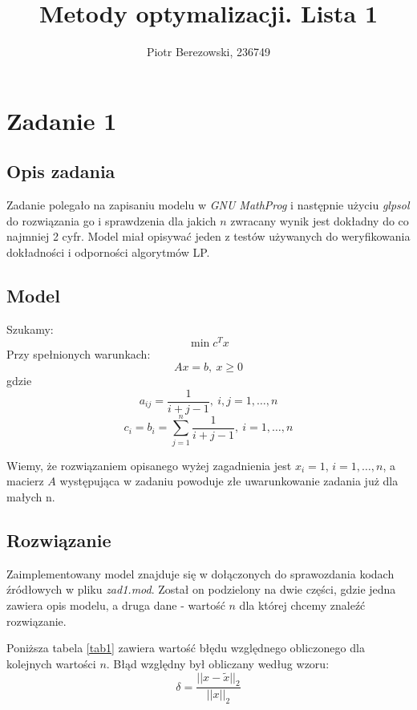 \documentclass{article}
\title{Metody optymalizacji. Lista 1}
\author{Piotr Berezowski, 236749}
\begin{document}
	\maketitle
	\newpage
	
	\section{Zadanie 1}
	\subsection{Opis zadania}

    Zadanie polegało na zapisaniu modelu w \textit{GNU MathProg} i następnie użyciu \textit{glpsol} do rozwiązania go i sprawdzenia dla jakich $n$ zwracany wynik 
    jest dokładny do co najmniej 2 cyfr. Model miał opisywać jeden z testów używanych do weryfikowania dokładności i odporności algorytmów LP.
    
    \subsection{Model}

    Szukamy:
    $$\min{c^T x}$$
    Przy spełnionych warunkach:
    $$Ax = b,\ x \geq 0$$
    gdzie
    $$a_{ij} = \frac{1}{i + j - 1},\ i, j = 1, \dots, n$$
    $$c_i = b_i = \sum_{j=1}^{n} \frac{1}{i + j - 1},\ i = 1, \dots, n$$
    
    Wiemy, że rozwiązaniem opisanego wyżej zagadnienia jest $x_i = 1$, $i = 1, \dots, n$, a macierz $A$ występująca w zadaniu powoduje złe uwarunkowanie 
    zadania już dla małych n.
    
    \subsection{Rozwiązanie}

    Zaimplementowany model znajduje się w dołączonych do sprawozdania kodach źródłowych w pliku \textit{zad1.mod}. Został on podzielony na dwie części, gdzie jedna 
    zawiera opis modelu, a druga dane - wartość $n$ dla której chcemy znaleźć rozwiązanie. 

    Poniższa tabela \ref{tab1} zawiera wartość błędu względnego obliczonego dla kolejnych wartości $n$. Błąd względny był obliczany według wzoru:
    $$\delta = \frac{||x - \tilde{x}||_2}{||x||_2}$$
\end{document}
